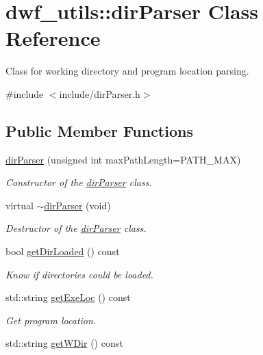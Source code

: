 \hypertarget{classdwf__utils_1_1dir_parser}{\section{dwf\-\_\-utils\-:\-:dir\-Parser \-Class \-Reference}
\label{classdwf__utils_1_1dir_parser}
}


\-Class for working directory and program location parsing.  




{\ttfamily \#include $<$include/dir\-Parser.\-h$>$}

\subsection*{\-Public \-Member \-Functions}
\begin{DoxyCompactItemize}
\item 
\hyperlink{classdwf__utils_1_1dir_parser_a87df43abb0b6c09f2222d7106b22b2fb}{dir\-Parser} (unsigned int max\-Path\-Length=\-P\-A\-T\-H\-\_\-\-M\-A\-X)
\begin{DoxyCompactList}\small\item\em \-Constructor of the \hyperlink{classdwf__utils_1_1dir_parser}{dir\-Parser} class. \end{DoxyCompactList}\item 
virtual \hyperlink{classdwf__utils_1_1dir_parser_a3728fb70aee4a7403dc716e0c275fe05}{$\sim$dir\-Parser} (void)
\begin{DoxyCompactList}\small\item\em \-Destructor of the \hyperlink{classdwf__utils_1_1dir_parser}{dir\-Parser} class. \end{DoxyCompactList}\item 
bool \hyperlink{classdwf__utils_1_1dir_parser_ad21b0a168bb9a0113f3a981f59f23b30}{get\-Dir\-Loaded} () const 
\begin{DoxyCompactList}\small\item\em \-Know if directories could be loaded. \end{DoxyCompactList}\item 
std\-::string \hyperlink{classdwf__utils_1_1dir_parser_a1d20d40355682eb3efe0148a4d370777}{get\-Exe\-Loc} () const 
\begin{DoxyCompactList}\small\item\em \-Get program location. \end{DoxyCompactList}\item 
std\-::string \hyperlink{classdwf__utils_1_1dir_parser_a3f9812dae1d05c192d286acedbffeeb4}{get\-W\-Dir} () const 

\end{DoxyCompactItemize}
